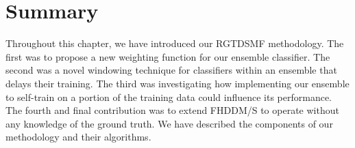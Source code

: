 
\section{Summary}
Throughout this chapter, we have introduced our RGTDSMF methodology. The first was to propose a new weighting function for our ensemble classifier. The second was a novel windowing technique for classifiers within an ensemble that delays their training. The third was investigating how implementing our ensemble to self-train on a portion of the training data could influence its performance. The fourth and final contribution was to extend FHDDM/S to operate without any knowledge of the ground truth. We have described the components of our methodology and their algorithms.